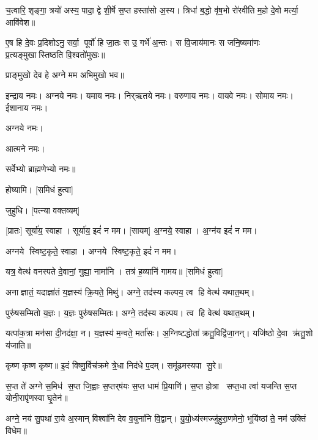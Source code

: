 
च॒त्वारि॒ शृङ्गा॒ त्रयो॑ अस्य॒ पादा॒ द्वे शी॒र्\mbox{}षे स॒प्त हस्ता॑सो अ॒स्य। त्रिधा॑ ब॒द्धो वृ॑ष॒भो रो॑रवीति म॒हो दे॒वो मर्त्या॒ आवि॑वेश॥

ए॒ष हि दे॒वः प्र॒दिशोऽनु॒ सर्वा॒ पूर्वो॑ हि जा॒तः स उ॒ गर्भे॑ अ॒न्तः। स वि॒जाय॑मानः स जनि॒ष्यमा॑णः प्र॒त्यङ्मुखास्तिष्ठति वि॒श्वतो॑मुखः॥ 

प्राङ्मुखो देव हे अग्ने मम अभिमुखो भव॥

इन्द्राय नमः। अग्नये नमः। यमाय नमः। निर्‌ऋतये नमः। 
वरुणाय नमः। वायवे नमः। सोमाय नमः। ईशानाय नमः। 

अग्नये नमः। 


आत्मने नमः। 

सर्वेभ्यो ब्राह्मणेभ्यो नमः॥


होष्यामि। [समिधं हुत्वा]

जुहुधि। [पत्न्या वक्तव्यम्]


[प्रातः] सूर्या॑य॒ स्वाहा। सूर्या॑य॒ इदं॑ न मम।
[सायम्] अ॒ग्नये॒ स्वाहा। अ॒ग्न॑य इदं॑ न मम।


अग्नये स्विष्ट॒कृते॒ स्वाहा। अग्नये स्विष्ट॒कृते॒ इदं॑ न मम।


यत्र॒ वेत्थ॑ वनस्पते दे॒वानां॒ गुह्या॒ नामा॑नि । तत्र॑ ह॒व्यानि॑ गामय॥ [समिधं हुत्वा]



अनाज्ञातं॒ यदाज्ञा॑तं य॒ज्ञस्य॑ क्रि॒यते॒ मिथु॑।
अग्ने॒ तद॑स्य कल्पय॒ त्व हि वेत्थ॑ यथात॒थम्।

पुरु॑षसम्मितो य॒ज्ञः। य॒ज्ञः पुरु॑षसम्मितः।
अग्ने॒ तद॑स्य कल्पय। त्व हि वेत्थ॑ यथात॒थम्।

यत्पा॑क॒त्रा मन॑सा दी॒नद॑क्षा॒ न। य॒ज्ञस्य॑ म॒न्वते॒ मर्ता॑सः।
अ॒ग्निष्टद्धोता॑ क्रतु॒विद्वि॑जा॒नन्। यजि॑ष्ठो दे॒वा ऋ॑तु॒शो य॑जाति॥

कृष्ण कृष्ण कृष्ण॥ इ॒दं विष्णु॒र्विच॑क्रमे त्रे॒धा निद॑धे प॒दम्। समू॑ढमस्यपा सु॒रे॥

स॒प्त ते॑ अग्ने स॒मिध॑ स॒प्त जि॒ह्वाः स॒प्तर्‌ष॑यः स॒प्त धाम॑ प्रि॒याणि॑। स॒प्त होत्रा सप्त॒धा त्वा॑ यजन्ति स॒प्त योनी॒रापृ॑णस्वा घृ॒तेन॑॥


अग्ने॒ नय॑ सु॒पथा॑ रा॒ये अ॒स्मान् विश्वा॑नि देव व॒युना॑नि वि॒द्वान्। यु॒यो॒ध्य॑स्मज्जु॑हुरा॒णमेनो॒ भूयि॑ष्ठां ते॒ नम॑ उक्तिं विधेम॥ 

